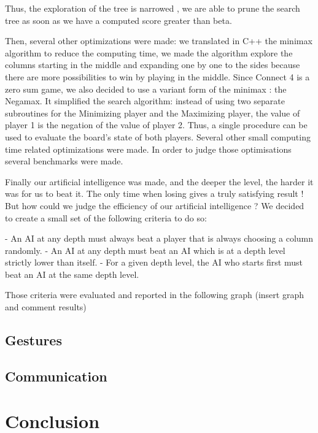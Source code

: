 \documentclass[12pt, a4paper, oneside]{report}
\begin{document}
Thus, the exploration of the tree is narrowed , we are able to prune the search tree as soon as we have a computed score greater than beta.


	Then, several other optimizations were made: we translated in C++ the minimax algorithm to reduce the computing time, we made the algorithm explore the columns starting in the middle and expanding one by one to the sides because there are more possibilities to win by playing in the middle. 
	Since Connect 4 is a zero sum game, we also decided to use a variant form of the minimax : the Negamax. It simplified the search algorithm: instead of using two separate subroutines for the Minimizing player and the Maximizing player, the value of player 1 is the negation of the value of player 2. Thus, a single procedure can be used to evaluate the board’s state of both players.
	Several other small computing time related optimizations were made. In order to judge those optimisations several benchmarks were made.


Finally our artificial intelligence was made, and the deeper the level, the harder it was for us to beat it. The only time when losing gives a truly satisfying result ! But how could we judge the efficiency of our artificial intelligence ? We decided to create a small set of the following criteria to do so:

- An AI at any depth must always beat a player that is always choosing a column randomly.
- An AI at any depth must beat an AI which is at a depth level strictly lower than itself.
- For a given depth level, the AI who starts first must beat an AI at the same depth level.

Those criteria were evaluated and reported in the following graph (insert graph and comment results) \\


	\section{Gestures}

	\section{Communication}

	\chapter{Conclusion}
\end{document}

